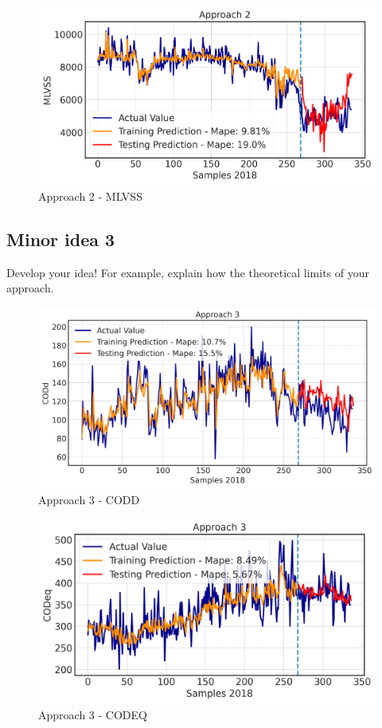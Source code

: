 \begin{figure}[h]
\centering
\includegraphics[width=\linewidth]{figures/Ch6/MVLSS-approach2.png}
\caption{Approach 2 - MLVSS}
\label{f:App2-MLVSS}
\end{figure}

\subsection{Minor idea 3}
\label{s:Contribution-2-Major-1-Minor-3}
Develop your idea! For example, explain how the theoretical limits of your approach.

\begin{figure}[h]
\centering
\includegraphics[width=\linewidth]{figures/Ch6/CODd-3.png}
\caption{Approach 3 - CODD}
\label{f:App3-codd}
\end{figure}

\begin{figure}[h]
\centering
\includegraphics[width=\linewidth]{figures/Ch6/CODeq-3.png}
\caption{Approach 3 - CODEQ}
\label{f:App3-codeq}
\end{figure}

